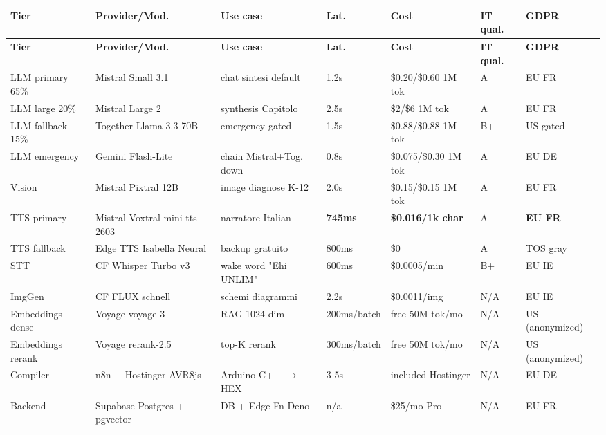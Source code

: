 \documentclass[12pt,a4paper]{article}
\begin{document}
\renewcommand{\arraystretch}{1.15}
\begin{small}
\begin{longtable}{p{2.4cm} p{2.4cm} p{2.0cm} p{1.4cm} p{1.4cm} p{1.0cm} p{1.6cm}}
\toprule
\textbf{Tier} & \textbf{Provider/Mod.} & \textbf{Use case} & \textbf{Lat.} & \textbf{Cost} & \textbf{IT qual.} & \textbf{GDPR} \\
\midrule
\endfirsthead
\toprule
\textbf{Tier} & \textbf{Provider/Mod.} & \textbf{Use case} & \textbf{Lat.} & \textbf{Cost} & \textbf{IT qual.} & \textbf{GDPR} \\
\midrule
\endhead

LLM primary 65\% & Mistral Small 3.1 & chat sintesi default & 1.2s & \$0.20/\$0.60 1M tok & A & EU FR \\
LLM large 20\%  & Mistral Large 2 & synthesis Capitolo & 2.5s & \$2/\$6 1M tok & A & EU FR \\
LLM fallback 15\% & Together Llama 3.3 70B & emergency gated & 1.5s & \$0.88/\$0.88 1M tok & B+ & US gated \\
LLM emergency & Gemini Flash-Lite & chain Mistral+Tog. down & 0.8s & \$0.075/\$0.30 1M tok & A & EU DE \\
Vision & Mistral Pixtral 12B & image diagnose K-12 & 2.0s & \$0.15/\$0.15 1M tok & A & EU FR \\
\rowcolor{elablime!18} TTS primary & Mistral Voxtral mini-tts-2603 & narratore Italian & \textbf{745ms} & \textbf{\$0.016/1k char} & A & \textbf{EU FR} \\
TTS fallback & Edge TTS Isabella Neural & backup gratuito & 800ms & \$0 & A & TOS gray \\
STT & CF Whisper Turbo v3 & wake word "Ehi UNLIM" & 600ms & \$0.0005/min & B+ & EU IE \\
ImgGen & CF FLUX schnell & schemi diagrammi & 2.2s & \$0.0011/img & N/A & EU IE \\
Embeddings dense & Voyage voyage-3 & RAG 1024-dim & 200ms/batch & free 50M tok/mo & N/A & US (anonymized) \\
Embeddings rerank & Voyage rerank-2.5 & top-K rerank & 300ms/batch & free 50M tok/mo & N/A & US (anonymized) \\
Compiler & n8n + Hostinger AVR8js & Arduino C++ $\rightarrow$ HEX & 3-5s & included Hostinger & N/A & EU DE \\
Backend & Supabase Postgres + pgvector & DB + Edge Fn Deno & n/a & \$25/mo Pro & N/A & EU FR \\

\bottomrule
\end{longtable}
\end{small}
\end{document}
